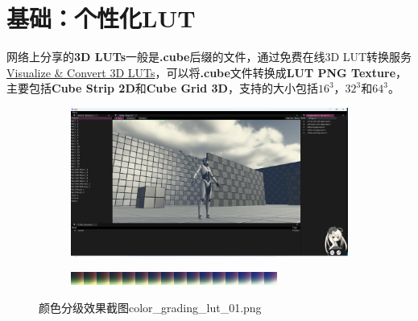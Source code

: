 \documentclass{ctexart}
\begin{document}
    \section{基础：个性化LUT} \label{section:basic2}
    网络上分享的\textbf{3D LUTs}一般是\textbf{.cube}后缀的文件，通过免费在线3D LUT转换服务\href{https://www.color.io/free-online-lut-converter}{Visualize \& Convert 3D LUTs}，可以将\textbf{.cube}文件转换成\textbf{LUT PNG Texture}，主要包括\textbf{Cube Strip 2D}和\textbf{Cube Grid 3D}，支持的大小包括$ 16^3 $，$ 32^3 $和$ 64^3 $。
    
    \begin{figure}[!htb]
        \centering
        \begin{subfigure}{1.0\textwidth}
            \includegraphics[width=\textwidth]{screen_shot_color_grading_map_color_grading_lut_01.png}
        \end{subfigure}
        \begin{subfigure}{1.0\textwidth}
            \includegraphics[width=\textwidth]{color_grading_lut_01.png}
        \end{subfigure}      
        \caption{颜色分级效果截图color\_grading\_lut\_01.png}
    \end{figure}
\end{document}
